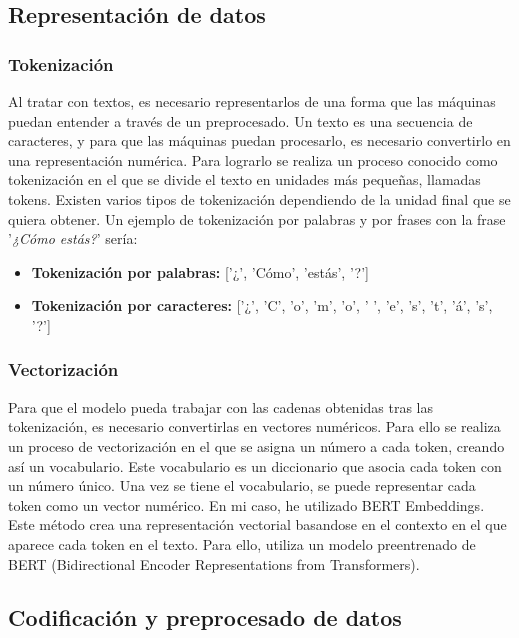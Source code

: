
\subsection{Representación de datos}

\subsubsection{Tokenización}

Al tratar con textos, es necesario representarlos de una forma que las máquinas puedan entender a través de un preprocesado.
Un texto es una secuencia de caracteres, y para que las máquinas puedan procesarlo, es necesario convertirlo en una representación numérica.
Para lograrlo se realiza un proceso conocido como tokenización\cite{medium:tokenization} en el que se divide el texto en unidades más pequeñas, llamadas tokens.
Existen varios tipos de tokenización dependiendo de la unidad final que se quiera obtener. Un ejemplo de tokenización por palabras y por frases con la frase '\textit{¿Cómo estás?}' sería:

\begin{itemize}
	\item \textbf{Tokenización por palabras:} ['¿', 'Cómo', 'estás', '?']
	\item \textbf{Tokenización por caracteres:} ['¿', 'C', 'o', 'm', 'o', ' ', 'e', 's', 't', 'á', 's', '?']
\end{itemize}

\subsubsection{Vectorización}

Para que el modelo pueda trabajar con las cadenas obtenidas tras las tokenización, es necesario convertirlas en vectores numéricos.
Para ello se realiza un proceso de vectorización en el que se asigna un número a cada token, creando así un vocabulario.
Este vocabulario es un diccionario que asocia cada token con un número único.
Una vez se tiene el vocabulario, se puede representar cada token como un vector numérico.
En mi caso, he utilizado BERT Embeddings. Este método crea una representación vectorial basandose en el contexto en el que aparece cada token en el texto. Para ello, utiliza un modelo preentrenado de BERT (Bidirectional Encoder Representations from Transformers).

\subsection{Codificación y preprocesado de datos}


